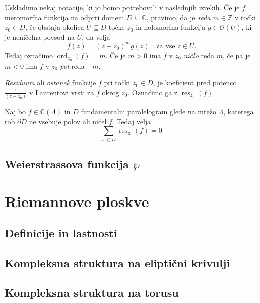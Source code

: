 \documentclass[mat1]{fmfdelo}
\newcommand{\Z}{\mathbb Z}
\newcommand{\C}{\mathbb C}
\newcommand{\res}[2]{\operatorname{res}_{#1}(#2)}
\newcommand{\ord}[2]{\operatorname{ord}_{#1}(#2)}
\newcommand{\hol}[1]{\mathcal{O}(#1)}
\theoremstyle{definition}
\begin{document}
Uskladimo nekaj notacije, ki jo bomo potrebovali v naslednjih izrekih. Če je $f$ meromorfna funkcija na odprti domeni $D \subseteq \C$, pravimo, da je \emph{reda $m \in \Z$} v točki $z_0 \in D$, če obstaja okolica $U \subseteq D$ točke $z_0$ in holomorfna funkcija $g \in \hol{U}$, ki je neničelna povsod na $U$, da velja 
\[
    f(z) = (z - z_0)^m g(z) \quad \text{za vse $z \in U$.}  
\]   
Tedaj označimo $\ord{z_0}{f} = m$. Če je $m > 0$ ima $f$ v $z_0$ \emph{ničlo} reda $m$, če pa je $m < 0$ ima $f$ v $z_0$ \emph{pol} reda $-m$.

\emph{Residuum} ali \emph{ostanek} funkcije $f$ pri točki $z_0 \in D$, je koeficient pred potenco $\frac{1}{(z-z_0)}$ v Laurentovi vrsti za $f$ okrog $z_0$. Označimo ga z $\res{z_0}{f}$. 

\begin{izrek}
    Naj bo $f \in \C(\Lambda)$ in $D$ fundamentalni paralelogram glede na mrežo $\Lambda$, katerega rob $\partial D$ ne vsebuje polov ali ničel $f$. Tedaj velja 
    \[
        \sum_{w \in D} \res{w}{f} = 0  
    \] 
\end{izrek}




\subsection{Weierstrassova funkcija $\wp$}
\break





\section{Riemannove ploskve} \label{riemannove ploskve}
\subsection{Definicije in lastnosti}
\subsection{Kompleksna struktura na eliptični krivulji}
\subsection{Kompleksna struktura na torusu}
\break
\end{document}
